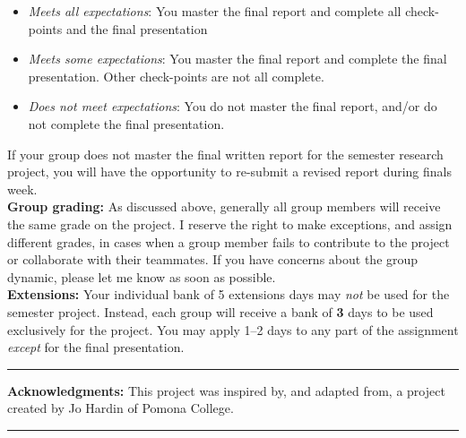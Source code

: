 \documentclass[11pt]{article}
\begin{document}
\begin{itemize}
\item \textit{Meets all expectations}: You master the final report and complete all check-points and the final presentation
\item \textit{Meets some expectations}: You master the final report and complete the final presentation. Other check-points are not all complete.
\item \textit{Does not meet expectations}: You do not master the final report, and/or do not complete the final presentation.
\end{itemize}

\noindent If your group does not master the final written report for the semester research project, you will have the opportunity to re-submit a revised report during finals week.\\

\noindent \textbf{Group grading:} As discussed above, generally all group members will receive the same grade on the project. I reserve the right to make exceptions, and assign different grades, in cases when a group member fails to contribute to the project or collaborate with their teammates. If you have concerns about the group dynamic, please let me know as soon as possible.\\

\noindent \textbf{Extensions:} Your individual bank of 5 extensions days may \textit{not} be used for the semester project. Instead, each group will receive a bank of \textbf{3} days to be used exclusively for the project. You may apply 1--2 days to any part of the assignment \textit{except} for the final presentation.

\vspace{3cm}

\hrule

$ $\\

\noindent \textbf{Acknowledgments:} This project was inspired by, and adapted from, a project created by Jo Hardin of Pomona College.\\

\hrule
\end{document}
